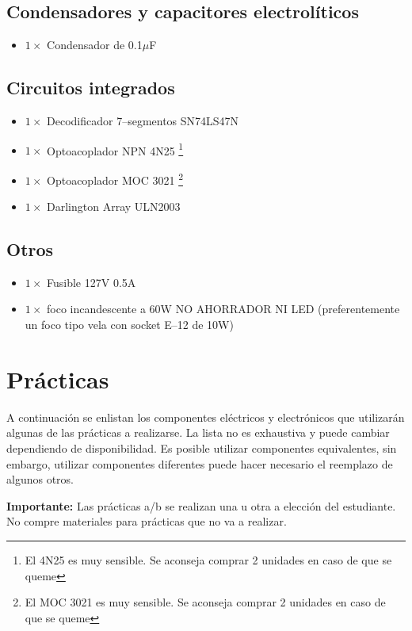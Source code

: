 \documentclass[letterpaper,10.5pt]{article}
\begin{document}
\subsection{Condensadores y capacitores electrolíticos}
\begin{itemize}[nosep]
	\item $1\times$ Condensador de 0.1$\mu$F
\end{itemize}

\subsection{Circuitos integrados}
\begin{itemize}[nosep]
	\item $1\times$ Decodificador 7–segmentos SN74LS47N
	\item $1\times$ Optoacoplador NPN 4N25
	\footnote{El 4N25 es muy sensible. Se aconseja comprar 2 unidades en caso de que se queme} %
	\item $1\times$ Optoacoplador MOC 3021
	\footnote{El MOC 3021 es muy sensible. Se aconseja comprar 2 unidades en caso de que se queme} %
	\item $1\times$ Darlington Array ULN2003
\end{itemize}

\subsection{Otros}
\begin{itemize}[nosep]
	\item $1\times$ Fusible 127V 0.5A
	\item $1\times$ foco incandescente a 60W NO AHORRADOR NI LED
	(preferentemente un foco tipo vela con socket E--12 de 10W)
\end{itemize}

\section{Prácticas}

A continuación se enlistan los componentes eléctricos y electrónicos que utilizarán algunas de las prácticas a realizarse. La lista no es exhaustiva y puede cambiar dependiendo de disponibilidad.
Es posible utilizar componentes equivalentes, sin embargo, utilizar componentes diferentes puede hacer necesario el reemplazo de algunos otros.

\textbf{Importante:} Las prácticas a/b se realizan una u otra a elección del estudiante.
No compre materiales para prácticas que no va a realizar.
\end{document}
